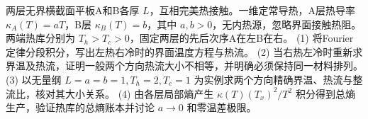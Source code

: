 两层无界横截面平板A和B各厚 \(L\)，互相完美热接触。一维定常导热，A层热导率 \(\kappa_A(T)=aT\)，B层 \(\kappa_B(T)=b\)，其中 \(a,b>0\)，无内热源，忽略界面接触热阻。两端热库分别为 \(T_h>T_c>0\)，固定两层的先后次序A在左B在右。
(1) 将Fourier定律分段积分，写出左热右冷时的界面温度方程与热流。
(2) 当右热左冷时重新求界温及热流，证明一般两个方向热流大小不相等，并明确必须保持同一材料排列。
(3) 以无量纲 \(L=a=b=1,T_h=2,T_c=1\) 为实例求两个方向精确界温、热流与整流比，核对其大小关系。
(4) 由各层局部熵产生 \(\kappa(T)(T_x)^2/T^2\) 积分得到总熵生产，验证热库的总熵账本并讨论 \(a\to0\) 和零温差极限。
